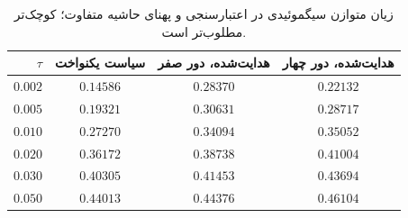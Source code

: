 \begin{table}[htbp]
\centering\small
\caption{زیان متوازن سیگموئیدی در اعتبارسنجی و پهنای حاشیه متفاوت؛ کوچک‌تر مطلوب‌تر است.}
\label{tab:ch4-sigmoid-loss-comparison}
\begin{tabular}{rccc}\hline
$\tau$ & سیاست یکنواخت & هدایت‌شده، دور صفر & هدایت‌شده، دور چهار\\\hline
$0.002$ & $0.14586$ & $0.28370$ & $0.22132$\\
$0.005$ & $0.19321$ & $0.30631$ & $0.28717$\\
$0.010$ & $0.27270$ & $0.34094$ & $0.35052$\\
$0.020$ & $0.36172$ & $0.38738$ & $0.41004$\\
$0.030$ & $0.40305$ & $0.41453$ & $0.43694$\\
$0.050$ & $0.44013$ & $0.44376$ & $0.46104$\\
\hline
\end{tabular}
\end{table}
